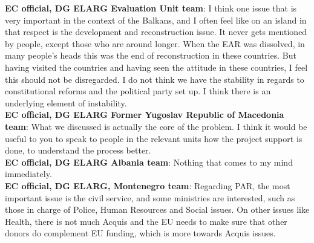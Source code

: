 \textbf{EC official, DG ELARG Evaluation Unit team}: I think one issue that is very important in the context of the Balkans, and I often feel like on an island in that respect is the development and reconstruction issue. It never gets mentioned by people, except those who are around longer. When the EAR was dissolved, in many people's heads this was the end of reconstruction in these countries. But having visited the countries and having seen the attitude in these countries, I feel this should not be disregarded. I do not think we have the stability in regards to constitutional reforms and the political party set up. I think there is an underlying element of instability.\\ 
\textbf{EC official, DG ELARG Former Yugoslav Republic of Macedonia team}: What we discussed is actually the core of the problem. I think it would be useful to you to speak to people in the relevant units how the project support is done, to understand the process better.\\
\textbf{EC official, DG ELARG Albania team}: Nothing that comes to my mind immediately.\\
\textbf{EC official, DG ELARG, Montenegro team}: Regarding PAR, the most important issue is the civil service, and some ministries are interested, such as those in charge of Police, Human Resources and Social issues. On other issues like Health, there is not much Acquis and the EU needs to make sure that other donors do complement EU funding, which is more towards Acquis issues. \\
